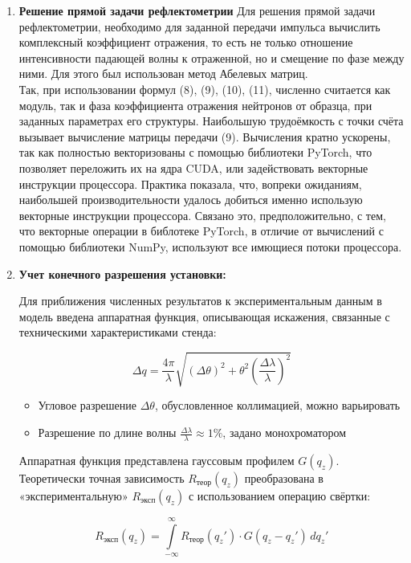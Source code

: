 \documentclass[a4paper]{article}
\begin{document}
\begin{enumerate}
\item \textbf{Решение прямой задачи рефлектометрии}
Для решения прямой задачи рефлектометрии, необходимо для заданной передачи импульса вычислить комплексный коэффициент отражения, то есть не только отношение интенсивности падающей волны к отраженной, но и смещение по фазе между ними. Для этого был использован метод Абелевых матриц.\\
Так, при использовании формул (8), (9), (10), (11), численно считается как модуль, так и фаза коэффициента отражения нейтронов от образца, при заданных параметрах его структуры.
Наибольшую трудоёмкость с точки счёта вызывает вычисление матрицы передачи (9). Вычисления кратно ускорены, так как полностью векторизованы с помощью библиотеки PyTorch, что позволяет переложить их на ядра CUDA, или задействовать векторные инструкции процессора. Практика показала, что, вопреки ожиданиям, наибольшей производительности удалось добиться именно использую векторные инструкции процессора. Связано это, предположительно, с тем, что векторные операции в библотеке PyTorch, в отличие от вычислений с помощью библиотеки NumPy, используют все имющиеся потоки процессора. \\

\item \textbf{Учет конечного разрешения установки:}

Для приближения численных результатов к экспериментальным данным в модель введена аппаратная функция, описывающая искажения, связанные с техническими характеристиками стенда:

\begin{equation}
\Delta q = \frac{4\pi}{\lambda} \sqrt{(\Delta\theta)^2 + \theta^2\left(\frac{\Delta\lambda}{\lambda}\right)^2}
\end{equation}

\begin{itemize}
\item Угловое разрешение $\Delta\theta$, обусловленное коллимацией, можно варьировать 
\item Разрешение по длине волны $\frac{\Delta\lambda}{\lambda} \approx 1\%$, задано монохроматором 
\end{itemize}

Аппаратная функция представлена гауссовым профилем $G(q_z)$. Теоретически точная зависимость $R_{\text{теор}}(q_z)$ преобразована в «экспериментальную» $R_{\text{эксп}}(q_z)$ с использованием операцию свёртки:

\begin{equation}
R_{\text{эксп}}(q_z) = \int\limits_{-\infty}^{\infty} R_{\text{теор}}(q_z') \cdot G(q_z - q_z') \, dq_z'
\end{equation}


\end{enumerate}
\end{document}
